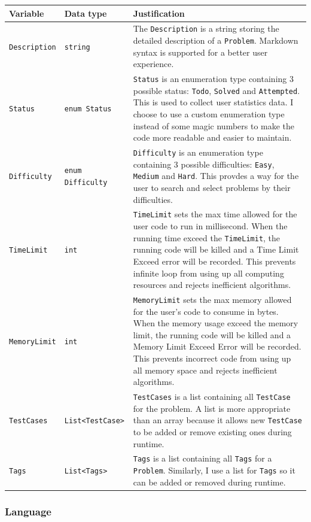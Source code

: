 \documentclass[a4paper]{report}
\begin{document}
\begin{tabulary}{\textwidth}{|l|l|L|}
    \hline
    Variable & Data type & Justification \\
    \hline
    \verb|Description| & \verb|string| & The \verb|Description| is a string storing the detailed description of a \verb|Problem|. Markdown syntax is supported for a better user experience. \\
    \hline
    \verb|Status| & \verb|enum Status| & \verb|Status| is an enumeration type containing 3 possible status: \verb|Todo|, \verb|Solved| and \verb|Attempted|. This is used to collect user statistics data. I choose to use a custom enumeration type instead of some magic numbers to make the code more readable and easier to maintain. \\
    \hline
    \verb|Difficulty| & \verb|enum Difficulty| & \verb|Difficulty| is an enumeration type containing 3 possible difficulties: \verb|Easy|, \verb|Medium| and \verb|Hard|. This provdes a way for the user to search and select problems by their difficulties. \\
    \hline
    \verb|TimeLimit| & \verb|int| & \verb|TimeLimit| sets the max time allowed for the user code to run in millisecond. When the running time exceed the \verb|TimeLimit|, the running code will be killed and a Time Limit Exceed error will be recorded. This prevents infinite loop from using up all computing resources and rejects inefficient algorithms. \\
    \hline
    \verb|MemoryLimit| & \verb|int| & \verb|MemoryLimit| sets the max memory allowed for the user's code to consume in bytes. When the memory usage exceed the memory limit, the running code will be killed and a Memory Limit Exceed Error will be recorded. This prevents incorrect code from using up all memory space and rejects inefficient algorithms. \\
    \hline
    \verb|TestCases| & \verb|List<TestCase>| & \verb|TestCases| is a list containing all \verb|TestCase| for the problem. A list is more appropriate than an array because it allows new \verb|TestCase| to be added or remove existing ones during runtime. \\
    \hline
    \verb|Tags| & \verb|List<Tags>| & \verb|Tags| is a list containing all \verb|Tags| for a \verb|Problem|. Similarly, I use a list for \verb|Tags| so it can be added or removed during runtime. \\
    \hline
\end{tabulary}

\subsubsection{Language}
\end{document}
